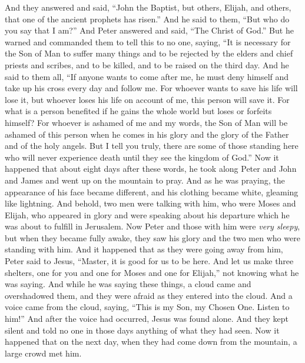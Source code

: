 \begin{biblechapter}
\verse And they answered and said, “John the Baptist, but others, Elijah, and others, that one of the ancient prophets has risen.”
\verse And he said to them, “But who do you say that I am?” And Peter answered and said, “The Christ of God.”
 But he warned and commanded them to tell this to no one,
\verse saying, “It is necessary for the Son of Man to suffer many things and to be rejected by the elders and chief priests and scribes, and to be killed, and to be raised on the third day.
 And he said to them all, “If anyone wants to come after me, he must deny himself and take up his cross every day and follow me.
\verse For whoever wants to save his life will lose it, but whoever loses his life on account of me, this person will save it.
\verse For what is a person benefited if he gains the whole world but loses or forfeits himself?
\verse For whoever is ashamed of me and my words, the Son of Man will be ashamed of this person when he comes in his glory and the glory of the Father and of the holy angels.
\verse But I tell you truly, there are some of those standing here who will never experience death until they see the kingdom of God.”
 Now it happened that about eight days after these words, he took along Peter and John and James and went up on the mountain to pray.
\verse And as he was praying, the appearance of his face became different, and his clothing became white, gleaming like lightning.
\verse And behold, two men were talking with him, who were Moses and Elijah,
\verse who appeared in glory and were speaking about his departure which he was about to fulfill in Jerusalem.
\verse Now Peter and those with him were \textit{very sleepy}, but when they became fully awake, they saw his glory and the two men who were standing with him.
\verse And it happened that as they were going away from him, Peter said to Jesus, “Master, it is good for us to be here. And let us make three shelters, one for you and one for Moses and one for Elijah,” not knowing what he was saying.
\verse And while he was saying these things, a cloud came and overshadowed them, and they were afraid as they entered into the cloud.
\verse And a voice came from the cloud, saying, “This is my Son, my Chosen One. Listen to him!”
\verse And after the voice had occurred, Jesus was found alone. And they kept silent and told no one in those days anything of what they had seen.
 Now it happened that on the next day, when they had come down from the mountain, a large crowd met him.

\end{biblechapter}
